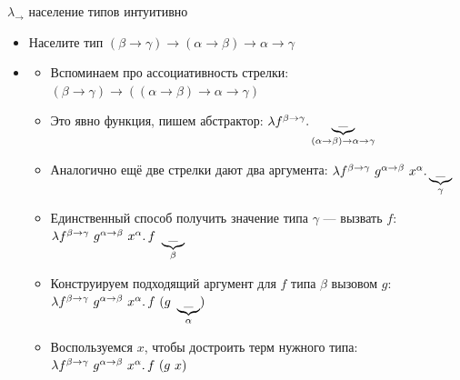     \begin{frame}[fragile]{$\lambda_\to$ население типов интуитивно}
        \begin{itemize}
            \item[\todo] Населите тип $(\beta\to\gamma)\to(\alpha\to\beta)\to\alpha\to\gamma$
            \item[\answer] \pause
            \begin{itemize}
                \item Вспоминаем про ассоциативность стрелки: $(\beta\to\gamma)\to((\alpha\to\beta)\to\alpha\to\gamma)$
                \item Это явно функция, пишем абстрактор: $\lambda f^{\beta\to\gamma}\ldotp \underbrace{\_}_{(\alpha\to\beta)\to\alpha\to\gamma}$
                \item Аналогично ещё две стрелки дают два аргумента: $\lambda f^{\beta\to\gamma}~ g^{\alpha\to\beta} ~ x^\alpha\ldotp \underbrace{\_}_\gamma$
                \item Единственный способ получить значение типа $\gamma$ --- вызвать $f$:\\
                $\lambda f^{\beta\to\gamma}~ g^{\alpha\to\beta} ~ x^\alpha\ldotp f ~ \underbrace{\_}_\beta$
                \item Конструируем подходящий аргумент для $f$ типа $\beta$ вызовом $g$:\\
                $\lambda f^{\beta\to\gamma}~ g^{\alpha\to\beta} ~ x^\alpha\ldotp f ~ (g ~ \underbrace{\_}_\alpha)$
                \item Воспользуемся $x$, чтобы достроить терм нужного типа:\\
                $\lambda f^{\beta\to\gamma}~ g^{\alpha\to\beta} ~ x^\alpha\ldotp f ~ (g ~ x)$
            \end{itemize}
        \end{itemize}
    \end{frame}



